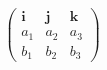 \documentclass[preview]{standalone}
\begin{document}
\begin{align*}
\begin{pmatrix} \mathbf{i} & \mathbf{j} & \mathbf{k} \\ a_1 & a_2 & a_3 \\ b_1 & b_2 & b_3 \end{pmatrix}
\end{align*}
\end{document}

